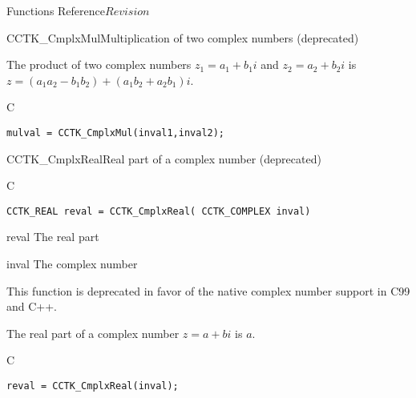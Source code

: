 \begin{cactuspart}{ Functions Reference}{}{$Revision$}
\begin{FunctionDescription}{CCTK\_CmplxMul}{Multiplication of two complex numbers (deprecated)}
\begin{Discussion}
The product of two complex numbers $z_1=a_1+b_1 i$ and $z_2=a_2+b_2 i$ is
$z=(a_1 a_2 - b_1 b_2) + (a_1 b_2 + a_2 b_1)i$.
\end{Discussion}
\begin{ExampleSection}
\begin{Example}{C}
\begin{verbatim}
mulval = CCTK_CmplxMul(inval1,inval2);
\end{verbatim}
\end{Example}
\end{ExampleSection}
\end{FunctionDescription}



\begin{FunctionDescription}{CCTK\_CmplxReal}{Real part of a complex number (deprecated)}
\label{CCTK-CmplxReal}
\begin{SynopsisSection}
\begin{Synopsis}{C}
\begin{verbatim}CCTK_REAL reval = CCTK_CmplxReal( CCTK_COMPLEX inval)\end{verbatim}
\end{Synopsis}
\end{SynopsisSection}
\begin{ParameterSection}
\begin{Parameter}{reval}
The real part
\end{Parameter}
\begin{Parameter}{inval}
The complex number
\end{Parameter}
\end{ParameterSection}
\begin{Discussion}
This function is deprecated in favor of the native complex number support in
C99 and C++.

The real part of a complex number $z=a+bi$ is $a$.
\end{Discussion}
\begin{ExampleSection}
\begin{Example}{C}
\begin{verbatim}
reval = CCTK_CmplxReal(inval);
\end{verbatim}
\end{Example}
\end{ExampleSection}
\end{FunctionDescription}


\end{cactuspart}
